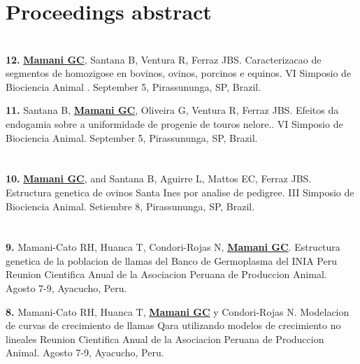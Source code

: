 \documentclass[margin,line,10pt]{res}
\newenvironment{list1}{
  \begin{list}{\ding{113}}{%
      \setlength{\itemsep}{0in}
      \setlength{\parsep}{0in} \setlength{\parskip}{0in}
      \setlength{\topsep}{0in} \setlength{\partopsep}{0in} 
      \setlength{\leftmargin}{0.17in}}}{\end{list}}
\begin{document}
\begin{resume}
\vspace{0.5cm}
\section{\sc Proceedings abstract}
\vspace{0.9cm}

\section{}
\begin{list1}
\item [\bf{12}.] {\bf \underline{Mamani GC}}, Santana B,  Ventura R, Ferraz JBS. 
Caracterizacao de segmentos de homozigose en bovinos, ovinos, porcinos e equinos.
VI Simposio de Biociencia Animal . September 5, Pirassununga, SP, Brazil. 
\vspace{0.5cm}
\item [\bf{11}.] Santana B, {\bf \underline{Mamani GC}}, Oliveira G,  Ventura R, Ferraz JBS. 
Efeitos da endogamia sobre a uniformidade de progenie de touros nelore..
VI Simposio de Biociencia Animal. September 5, Pirassununga, SP, Brazil. 
\end{list1}

\section{}
\begin{list1}
\item [\bf{10}.] {\bf \underline{Mamani GC}}, and Santana B, Aguirre L, Mattos EC, Ferraz JBS. 
Estructura genetica de ovinos Santa Ines por analise de pedigree.
III Simposio de Biociencia Animal. Setiembre 8, Pirassununga, SP, Brazil. 
\end{list1}

\section{}
\begin{list1}
\item [\bf{9}.] Mamani-Cato RH, Huanca T, Condori-Rojas N, {\bf \underline{Mamani GC}}.
Estructura genetica de la poblacion de llamas del Banco de Germoplasma del INIA Peru
Reunion Cientifica Anual de la Asociacion Peruana de Produccion Animal. Agosto 7-9, Ayacucho, Peru. 
\vspace{0.5cm}

\item [\bf{8}.] Mamani-Cato RH, Huanca T, {\bf \underline{Mamani GC}} y Condori-Rojas N.
Modelacion de curvas de crecimiento de llamas Qara utilizando modelos de crecimiento no lineales
Reunion Cientifica Anual de la Asociacion Peruana de Produccion Animal. Agosto 7-9, Ayacucho, Peru. 
\vspace{0.5cm}


\end{list1}
\end{resume}
\end{document}
